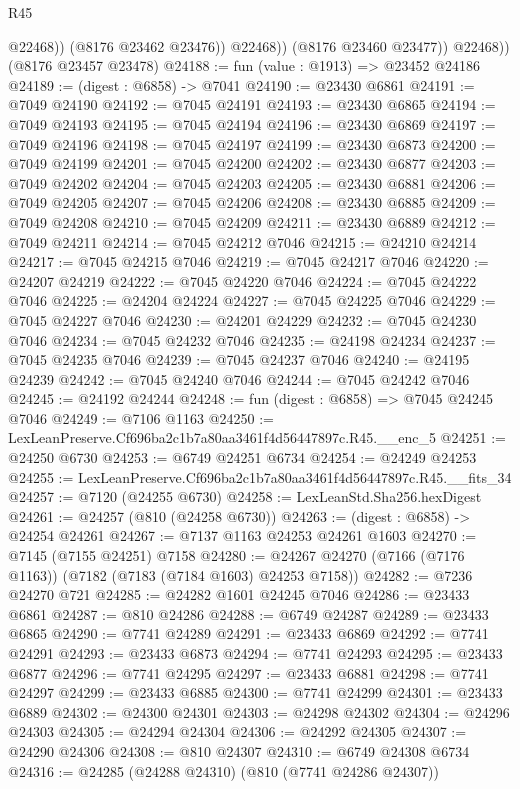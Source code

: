 \begin{lexlean}{R45}
\begin{coremodule}
{                    @22468))
                (@8176 @23462 @23476))
              @22468))
          (@8176 @23460 @23477))
        @22468))
    (@8176 @23457 @23478)
@24188 := fun (value : @1913) => @23452 @24186
@24189 := (digest : @6858) -> @7041
@24190 := @23430 @6861
@24191 := @7049 @24190
@24192 := @7045 @24191
@24193 := @23430 @6865
@24194 := @7049 @24193
@24195 := @7045 @24194
@24196 := @23430 @6869
@24197 := @7049 @24196
@24198 := @7045 @24197
@24199 := @23430 @6873
@24200 := @7049 @24199
@24201 := @7045 @24200
@24202 := @23430 @6877
@24203 := @7049 @24202
@24204 := @7045 @24203
@24205 := @23430 @6881
@24206 := @7049 @24205
@24207 := @7045 @24206
@24208 := @23430 @6885
@24209 := @7049 @24208
@24210 := @7045 @24209
@24211 := @23430 @6889
@24212 := @7049 @24211
@24214 := @7045 @24212 @7046
@24215 := @24210 @24214
@24217 := @7045 @24215 @7046
@24219 := @7045 @24217 @7046
@24220 := @24207 @24219
@24222 := @7045 @24220 @7046
@24224 := @7045 @24222 @7046
@24225 := @24204 @24224
@24227 := @7045 @24225 @7046
@24229 := @7045 @24227 @7046
@24230 := @24201 @24229
@24232 := @7045 @24230 @7046
@24234 := @7045 @24232 @7046
@24235 := @24198 @24234
@24237 := @7045 @24235 @7046
@24239 := @7045 @24237 @7046
@24240 := @24195 @24239
@24242 := @7045 @24240 @7046
@24244 := @7045 @24242 @7046
@24245 := @24192 @24244
@24248 := fun (digest : @6858) => @7045 @24245 @7046
@24249 := @7106 @1163
@24250 := LexLeanPreserve.Cf696ba2c1b7a80aa3461f4d56447897c.R45.__enc_5
@24251 := @24250 @6730
@24253 := @6749 @24251 @6734
@24254 := @24249 @24253
@24255 := LexLeanPreserve.Cf696ba2c1b7a80aa3461f4d56447897c.R45.__fits_34
@24257 := @7120 (@24255 @6730)
@24258 := LexLeanStd.Sha256.hexDigest
@24261 := @24257 (@810 (@24258 @6730))
@24263 := (digest : @6858) -> @24254 @24261
@24267 := @7137 @1163 @24253 @24261 @1603
@24270 := @7145 (@7155 @24251) @7158
@24280 := @24267 @24270 (@7166 (@7176 @1163)) (@7182 (@7183 (@7184 @1603) @24253 @7158))
@24282 := @7236 @24270 @721
@24285 := @24282 @1601 @24245 @7046
@24286 := @23433 @6861
@24287 := @810 @24286
@24288 := @6749 @24287
@24289 := @23433 @6865
@24290 := @7741 @24289
@24291 := @23433 @6869
@24292 := @7741 @24291
@24293 := @23433 @6873
@24294 := @7741 @24293
@24295 := @23433 @6877
@24296 := @7741 @24295
@24297 := @23433 @6881
@24298 := @7741 @24297
@24299 := @23433 @6885
@24300 := @7741 @24299
@24301 := @23433 @6889
@24302 := @24300 @24301
@24303 := @24298 @24302
@24304 := @24296 @24303
@24305 := @24294 @24304
@24306 := @24292 @24305
@24307 := @24290 @24306
@24308 := @810 @24307
@24310 := @6749 @24308 @6734
@24316 := @24285 (@24288 @24310) (@810 (@7741 @24286 @24307))
}
\end{coremodule}
\end{lexlean}
